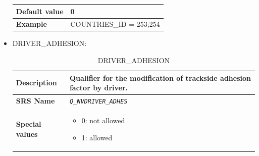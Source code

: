\begin{itemize}
\begin{longtable}{|l|l|}
				\hline

					\begin{minipage}[t]{0.22\linewidth} \textbf{Default value}	\end{minipage}
				&	\begin{minipage}[t]{0.78\linewidth} 0 \end{minipage} \\

				\hline

					\begin{minipage}[t]{0.22\linewidth} \textbf{Example}	\end{minipage}
				&	\begin{minipage}[t]{0.78\linewidth} COUNTRIES\_ID = 253;254 \end{minipage} \\

				\hline

			\end{longtable}

		\item DRIVER\_ADHESION:

			\begin{longtable}{|l|l|}
				\caption{DRIVER\_ADHESION}\\
				\hline

					\begin{minipage}[t]{0.22\linewidth} \textbf{Description}	\end{minipage}
				&	\begin{minipage}[t]{0.78\linewidth} Qualifier for the modification of trackside adhesion factor by driver. \end{minipage} \\

				\hline

					\begin{minipage}[t]{0.22\linewidth} \textbf{SRS Name}	\end{minipage}
				&	\begin{minipage}[t]{0.78\linewidth} \emph{\texttt{Q\_NVDRIVER\_ADHES}} \end{minipage} \\

				\hline

					\begin{minipage}[t]{0.22\linewidth} \textbf{Special values}	\end{minipage}
				&	\begin{minipage}[t]{0.78\linewidth} \begin{itemize} \item 0: not allowed \item 1: allowed \end{itemize} \end{minipage} \\


\end{longtable}
\end{itemize}
